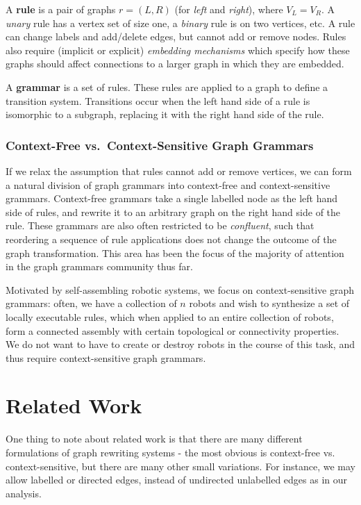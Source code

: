 \documentclass[]{article}
\begin{document}
A \textbf{rule} is a pair of graphs \(r=(L,R)\) (for \emph{left} and
\emph{right}), where \(V_L = V_R\). A \emph{unary} rule has a vertex set
of size one, a \emph{binary} rule is on two vertices, etc. A rule can
change labels and add/delete edges, but cannot add or remove nodes.
Rules also require (implicit or explicit) \emph{embedding mechanisms}
which specify how these graphs should affect connections to a larger
graph in which they are embedded.

A \textbf{grammar} is a set of rules. These rules are applied
 to a graph to define a transition system. Transitions occur
when the left hand side of a rule is isomorphic to a subgraph, replacing it 
with the right hand side of the rule.

\subsubsection{Context-Free vs.~Context-Sensitive Graph
Grammars}\label{context-free-vs.context-sensitive-graph-grammars}

If we relax the assumption that rules cannot add or remove vertices, we
can form a natural division of graph grammars into context-free and
context-sensitive grammars. Context-free grammars take a single labelled
node as the left hand side of rules, and rewrite it to an arbitrary graph on
the right hand side of the rule. These grammars are also
often restricted to be \emph{confluent}, such that reordering a
sequence of rule applications does not change the outcome of the graph
transformation. This area has been the focus of the majority of
attention in the graph grammars community thus far.

Motivated by self-assembling robotic systems, we focus on context-sensitive
graph grammars: often, we have a collection of $n$ robots and wish to synthesize a
set of locally executable rules, which when applied to an entire collection of
robots, form a connected assembly with certain topological or connectivity
properties. We do not want to have to create or destroy robots in the course of
this task, and thus require context-sensitive graph grammars.

\section{Related Work}

One thing to note about related work is that there are many different
formulations of graph rewriting systems - the most obvious is context-free vs.
context-sensitive, but there are many other small variations. For instance, we
may allow labelled or directed edges, instead of undirected unlabelled edges as
in our analysis.
\end{document}

